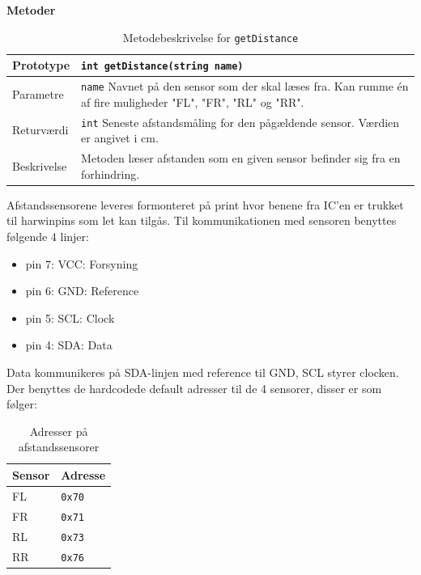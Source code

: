 \textbf{Metoder}

\begin{table}[h]
	\begin{tabularx}{\textwidth}{| L{2.5 cm} | Z |} \hline
	Prototype 	& \texttt{int getDistance(string name)} \\\hline
	Parametre 	& \texttt{name} \newline Navnet på den sensor som der skal læses fra. Kan rumme én af fire muligheder "FL", "FR", "RL" og "RR". \\\hline
	Returværdi 	& \texttt{int} \newline Seneste afstandsmåling for den pågældende sensor. Værdien er angivet i cm. \\\hline
	Beskrivelse & Metoden læser afstanden som en given sensor befinder sig fra en forhindring. \\\hline
	\end{tabularx}
	\caption{Metodebeskrivelse for \texttt{getDistance}}
	\label{table:met_getdistance}
\end{table}
\clearpage




Afstandssensorene leveres formonteret på print hvor benene fra IC'en er trukket til harwinpins som let kan tilgås. Til kommunikationen med sensoren benyttes følgende 4 linjer: 

\begin{itemize}
	\item pin 7: VCC: Forsyning
	\item pin 6: GND: Reference
	\item pin 5: SCL: Clock
	\item pin 4: SDA: Data
\end{itemize}

Data kommunikeres på SDA-linjen med reference til GND,  SCL styrer clocken.
Der benyttes de hardcodede default adresser til de 4 sensorer, disser er som følger: 

\begin{table}[h]\centering
	\begin{tabular}{| l | l |} \hline
		\textbf{Sensor} 	& \textbf{Adresse}  \\\hline
		FL 					& \texttt{0x70} 	\\\hline
		FR 					& \texttt{0x71} 	\\\hline
		RL 					& \texttt{0x73} 	\\\hline
		RR 					& \texttt{0x76} 	\\\hline
	\end{tabular}
	\caption{Adresser på afstandssensorer}
	\label{table:adr_afstandssensorer}
\end{table}

